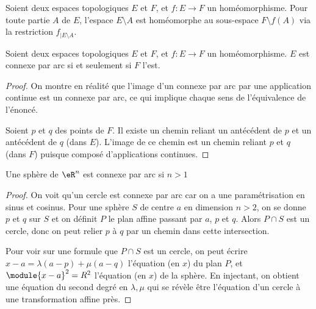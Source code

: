  \begin{rem}Soient deux espaces topologiques $E$ et $F$, et $f :
   E\to F$ un homéomorphisme. Pour toute partie $A$ de $E$,
   l'espace $E\setminus A$ est homéomorphe au sous-espace $F\setminus
   f(A)$ via la restriction $f_{\vert E\setminus A}$.\end{rem}

 \begin{lem}Soient deux espaces topologiques $E$ et $F$, et $f :
   E\to F$ un homéomorphisme. $E$ est connexe par arc si et
   seulement si $F$ l'est.\end{lem}
 \begin{proof}On montre en réalité que l'image d'un connexe par arc
   par une application continue est un connexe par arc, ce qui
   implique chaque sens de l'équivalence de l'énoncé.

   Soient $p$ et $q$ des points de $F$. Il existe un chemin reliant
   un antécédent de $p$ et un antécédent de $q$ (dans $E$). L'image
   de ce chemin est un chemin reliant $p$ et $q$ (dans $F$) puisque
   composé d'applications continues.
 \end{proof}

 \begin{lem}Une sphère de $\eR^n$ est connexe par arc si $n >
   1$\end{lem}
 \begin{proof}On voit qu'un cercle est connexe par arc car on a une
   paramétrisation en sinus et cosinus. Pour une sphère $S$ de centre
   $a$ en dimension $n > 2$, on se donne $p$ et $q$ sur $S$ et on
   définit $P$ le plan affine passant par $a$, $p$ et $q$. Alors $P
   \cap S$ est un cercle, donc on peut relier $p$ à $q$ par un chemin
   dans cette intersection.

   Pour voir sur une formule que $P \cap S$ est un cercle, on peut
   écrire $x - a = \lambda(a-p) + \mu(a-q)$ l'équation (en $x$) du
   plan $P$, et $\module{x-a}^2 = R^2$ l'équation (en $x$) de la
   sphère. En injectant, on obtient une équation du second degré en
   $\lambda,\mu$ qui se révèle être l'équation d'un cercle à une
   transformation affine près.
 \end{proof}

